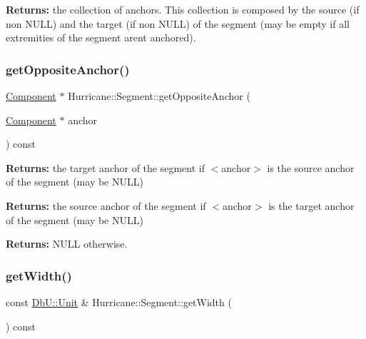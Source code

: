 {\bfseries Returns\+:} the collection of anchors. This collection is composed by the source (if non N\+U\+LL) and the target (if non N\+U\+LL) of the segment (may be empty if all extremities of the segment aren\textquotesingle{}t anchored). \mbox{\label{classHurricane_1_1Segment_aa425757f271df5c58b024b0494c21588}} 
\subsubsection{\texorpdfstring{get\+Opposite\+Anchor()}{getOppositeAnchor()}}
{\footnotesize\ttfamily \mbox{\hyperlink{classHurricane_1_1Component}{Component}} $\ast$ Hurricane\+::\+Segment\+::get\+Opposite\+Anchor (\begin{DoxyParamCaption}\item[{\mbox{\hyperlink{classHurricane_1_1Component}{Component}} $\ast$}]{anchor }\end{DoxyParamCaption}) const}

{\bfseries Returns\+:} the target anchor of the segment if {\ttfamily $<$anchor$>$} is the source anchor of the segment (may be N\+U\+LL)

{\bfseries Returns\+:} the source anchor of the segment if {\ttfamily $<$anchor$>$} is the target anchor of the segment (may be N\+U\+LL)

{\bfseries Returns\+:} N\+U\+LL otherwise. \mbox{\label{classHurricane_1_1Segment_a36c7ddda39077385bd8747a8c1df726a}} 
\subsubsection{\texorpdfstring{get\+Width()}{getWidth()}}
{\footnotesize\ttfamily const \mbox{\hyperlink{group__DbUGroup_ga4fbfa3e8c89347af76c9628ea06c4146}{Db\+U\+::\+Unit}} \& Hurricane\+::\+Segment\+::get\+Width (\begin{DoxyParamCaption}{ }\end{DoxyParamCaption}) const\hspace{0.3cm}{\ttfamily [inline]}}

